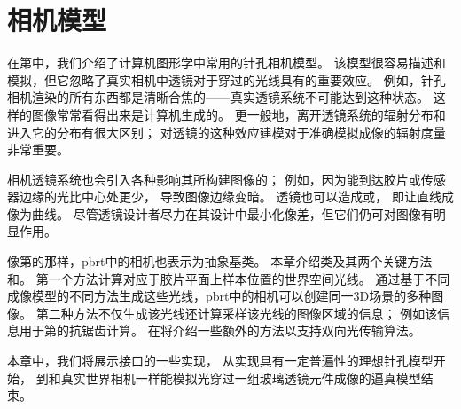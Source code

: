 \chapter{相机模型}\label{chap:相机模型}
\setcounter{sidenote}{1}

在第中，我们介绍了计算机图形学中常用的针孔相机模型。
该模型很容易描述和模拟，但它忽略了真实相机中透镜对于穿过的光线具有的重要效应。
例如，针孔相机渲染的所有东西都是清晰合焦的——真实透镜系统不可能达到这种状态。
这样的图像常常看得出来是计算机生成的。
更一般地，离开透镜系统的辐射分布和进入它的分布有很大区别；
对透镜的这种效应建模对于准确模拟成像的辐射度量非常重要。

相机透镜系统也会引入各种影响其所构建图像的；
例如，因为能到达胶片或传感器边缘的光比中心处更少，
导致图像边缘变暗。
透镜也可以造成或，
即让直线成像为曲线。
尽管透镜设计者尽力在其设计中最小化像差，但它们仍可对图像有明显作用。

像第的那样，pbrt中的相机也表示为抽象基类。
本章介绍类及其两个关键方法
和。
第一个方法计算对应于胶片平面上样本位置的世界空间光线。
通过基于不同成像模型的不同方法生成这些光线，pbrt中的相机可以创建同一3D场景的多种图像。
第二种方法不仅生成该光线还计算采样该光线的图像区域的信息；
例如该信息用于第的抗锯齿计算。
在将介绍一些额外的方法以支持双向光传输算法。

本章中，我们将展示接口的一些实现，
从实现具有一定普遍性的理想针孔模型开始，
到和真实世界相机一样能模拟光穿过一组玻璃透镜元件成像的逼真模型结束。













